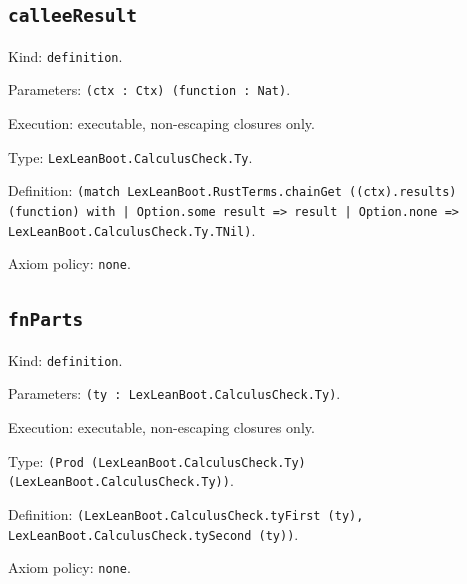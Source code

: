 \documentclass[11pt]{article}
\begin{document}
\subsection*{\texttt{calleeResult}}
\noindent Kind: \texttt{definition}.\par
\noindent Parameters: \texttt{(ctx : Ctx) (function : Nat)}.\par
\noindent Execution: executable, non-escaping closures only.\par
\noindent Type: \texttt{LexLeanBoot.CalculusCheck.Ty}.\par
\noindent Definition: \texttt{(match LexLeanBoot.RustTerms.chainGet ((ctx).results) (function) with | Option.some result => result | Option.none => LexLeanBoot.CalculusCheck.Ty.TNil)}.\par
\noindent Axiom policy: \texttt{none}.\par
\subsection*{\texttt{fnParts}}
\noindent Kind: \texttt{definition}.\par
\noindent Parameters: \texttt{(ty : LexLeanBoot.CalculusCheck.Ty)}.\par
\noindent Execution: executable, non-escaping closures only.\par
\noindent Type: \texttt{(Prod (LexLeanBoot.CalculusCheck.Ty) (LexLeanBoot.CalculusCheck.Ty))}.\par
\noindent Definition: \texttt{(LexLeanBoot.CalculusCheck.tyFirst (ty), LexLeanBoot.CalculusCheck.tySecond (ty))}.\par
\noindent Axiom policy: \texttt{none}.\par
\end{document}
